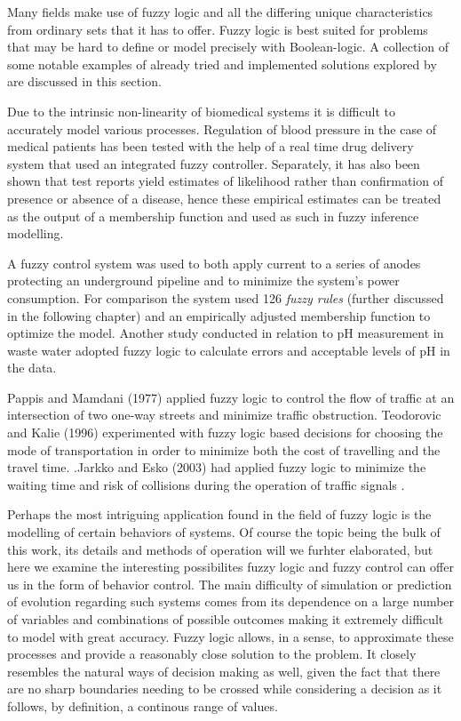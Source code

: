 Many fields make use of fuzzy logic and all the differing unique characteristics from ordinary sets that it has to offer. Fuzzy logic is best suited for problems that may be hard to define or model precisely with Boolean-logic. A collection of some notable examples of already tried and implemented solutions explored by \cite{makkar2018} are discussed in this section.

Due to the intrinsic non-linearity of biomedical systems it is difficult to accurately model various processes. Regulation of blood pressure in the case of medical patients has been tested with the help of a real time drug delivery system that used an integrated fuzzy controller. Separately, it has also been shown that test reports yield estimates of likelihood rather than confirmation of presence or absence of a disease, hence these empirical estimates can be treated as the output of a membership function and used as such in fuzzy inference modelling.

A fuzzy control system was used to both apply current to a series of anodes protecting an underground pipeline and to minimize the system's power consumption. For comparison the system used 126 \textit{fuzzy rules} (further discussed in the following chapter) and an empirically adjusted membership function to optimize the model. Another study conducted in relation to pH measurement in waste water adopted fuzzy logic to calculate errors and acceptable levels of pH in the data. 

Pappis and Mamdani (1977) applied fuzzy logic to control the flow of traffic at an intersection of two one-way streets and minimize traffic obstruction. Teodorovic and Kalie (1996) experimented with fuzzy logic based decisions for choosing the mode of transportation in order to minimize both the cost of travelling and the travel time. .Jarkko and Esko (2003) had applied fuzzy logic to minimize the waiting time and risk of collisions during the operation of traffic signals .

Perhaps the most intriguing application found in the field of fuzzy logic is the modelling of certain behaviors of systems. Of course the topic being the bulk of this work, its details and methods of operation will we furhter elaborated, but here we examine the interesting possibilites fuzzy logic and fuzzy control can offer us in the form of  behavior control. The main difficulty of simulation or prediction of evolution regarding such systems comes from its dependence on a large number of variables and combinations of possible outcomes making it extremely difficult to model with great accuracy. Fuzzy logic allows, in a sense, to approximate these processes and provide a reasonably close solution to the problem. It closely resembles the natural ways of decision making as well, given the fact that there are no sharp boundaries needing to be crossed while considering a decision as it follows, by definition, a continous range of values.

